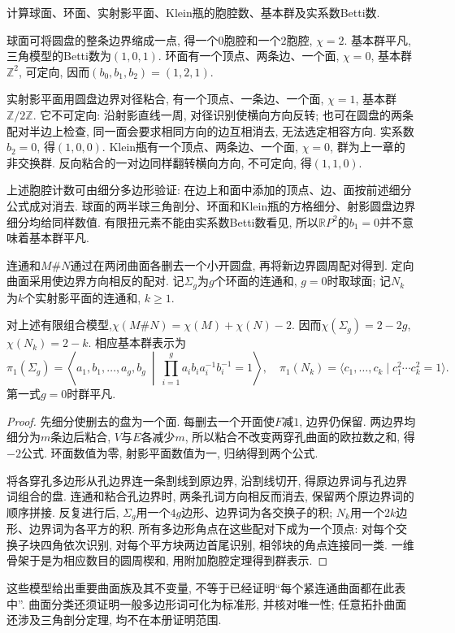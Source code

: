 \begin{example}
计算球面、环面、实射影平面、Klein瓶的胞腔数、基本群及实系数Betti数.
\end{example}
\begin{solution}
球面可将圆盘的整条边界缩成一点, 得一个$0$胞腔和一个$2$胞腔, $\chi=2$. 基本群平凡, 三角模型的Betti数为$(1,0,1)$. 环面有一个顶点、两条边、一个面, $\chi=0$, 基本群$\mathbb Z^2$, 可定向, 因而$(b_0,b_1,b_2)=(1,2,1)$.

实射影平面用圆盘边界对径粘合, 有一个顶点、一条边、一个面, $\chi=1$, 基本群$\mathbb Z/2\mathbb Z$. 它不可定向: 沿射影直线一周, 对径识别使横向方向反转; 也可在圆盘的两条配对半边上检查, 同一面会要求相同方向的边互相消去, 无法选定相容方向. 实系数$b_2=0$, 得$(1,0,0)$. Klein瓶有一个顶点、两条边、一个面, $\chi=0$, 群为上一章的非交换群. 反向粘合的一对边同样翻转横向方向, 不可定向, 得$(1,1,0)$.

上述胞腔计数可由细分多边形验证: 在边上和面中添加的顶点、边、面按前述细分公式成对消去. 球面的两半球三角剖分、环面和Klein瓶的方格细分、射影圆盘边界细分均给同样数值. 有限扭元素不能由实系数Betti数看见, 所以$\mathbb RP^2$的$b_1=0$并不意味着基本群平凡.
\end{solution}

\begin{definition}
连通和$M\#N$通过在两闭曲面各删去一个小开圆盘, 再将新边界圆周配对得到. 定向曲面采用使边界方向相反的配对. 记$\Sigma_g$为$g$个环面的连通和, $g=0$时取球面; 记$N_k$为$k$个实射影平面的连通和, $k\ge1$.
\end{definition}
\begin{proposition}\label{thm:connected-sum-euler}
对上述有限组合模型,$\chi(M\#N)=\chi(M)+\chi(N)-2$. 因而$\chi(\Sigma_g)=2-2g$, $\chi(N_k)=2-k$. 相应基本群表示为
\[
 \pi_1(\Sigma_g)=\left\langle a_1,b_1,\ldots,a_g,b_g\ \middle|\
 \prod_{i=1}^g a_ib_ia_i^{-1}b_i^{-1}=1\right\rangle,
 \quad
 \pi_1(N_k)=\langle c_1,\ldots,c_k\mid c_1^2\cdots c_k^2=1\rangle.
\]
第一式$g=0$时群平凡.
\end{proposition}
\begin{proof}
先细分使删去的盘为一个面. 每删去一个开面使$F$减$1$, 边界仍保留. 两边界均细分为$m$条边后粘合, $V$与$E$各减少$m$, 所以粘合不改变两穿孔曲面的欧拉数之和, 得$-2$公式. 环面数值为零, 射影平面数值为一, 归纳得到两个公式.

将各穿孔多边形从孔边界连一条割线到原边界, 沿割线切开, 得原边界词与孔边界词组合的盘. 连通和粘合孔边界时, 两条孔词方向相反而消去, 保留两个原边界词的顺序拼接. 反复进行后, $\Sigma_g$用一个$4g$边形、边界词为各交换子的积; $N_k$用一个$2k$边形、边界词为各平方的积. 所有多边形角点在这些配对下成为一个顶点: 对每个交换子块四角依次识别, 对每个平方块两边首尾识别, 相邻块的角点连接同一类. 一维骨架于是为相应数目的圆周楔和, 用附加胞腔定理得到群表示.
\end{proof}
这些模型给出重要曲面族及其不变量, 不等于已经证明“每个紧连通曲面都在此表中”. 曲面分类还须证明一般多边形词可化为标准形, 并核对唯一性; 任意拓扑曲面还涉及三角剖分定理, 均不在本册证明范围.

